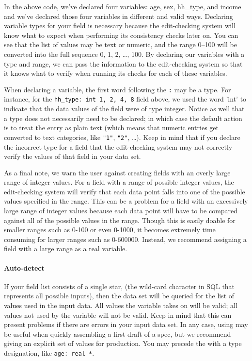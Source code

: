 \documentclass{article}
\begin{document}
In the above code, we've declared four variables: age, sex, hh\_type, and income and we've 
declared those four variables in different and valid ways. Declaring variable types for your 
field is necessary because the edit-checking system will know what to expect when performing 
its consistency checks later on. You can see that the list of values may be text 
or numeric, and the range 0--100 will be converted into the full sequence 0, 1, 2, \dots, 100. 
By declaring our variables with a type and range, we can pass the information to the edit-checking system 
so that it knows what to verify when running its checks for each of these variables. 

When declaring a variable, the first word following the {\tt :} may be a type. For instance, 
for the {\tt hh\_type: int 1, 2, 4, 8} field above, we used the word 'int' to indicate that 
the data values of the field were of type integer. Notice as well that a type does not necessarily 
need to be declared; in which case the default action is to treat the entry as plain text (which means
that numeric entries get converted to text categories, like {\tt "1"}, {\tt "2"}, \dots). Keep in mind 
that if you declare the incorrect type for a field that the edit-checking system may not correctly 
verify the values of that field in your data set.

As a final note, we warn the user against creating fields with an overly large range of integer 
values. For a field with a range of possible integer values, the edit-checking system will verify 
that each data point falls into one of the possible values specified in the range. This can be a 
problem for a field with an excessively large range of integer values because each data point will 
have to be compared against all of the possible values in the range. Though this is easily doable for 
smaller ranges such as 0-100 or even 0-1000, it becomes extremely time consuming for larger ranges such 
as 0-600000. Instead, we recommend assigning a field with a large range as a real variable.

\paragraph{Auto-detect} If your field list consists of a single star, {\tt *} (the wild-card character 
in SQL that represents all possible inputs), then the data set will be queried for the list of values 
used in the input data. All values the variable takes on will be valid; all values not used 
by the variable will not be valid. Keep in mind that this can present problems if there are errors 
in your input data set.
In any case, using {\tt *} may be useful when quickly assembling a first draft of a spec, but we recommend
giving an explicit set of values for production. You may precede the {\tt *}
with a type designation, like {\tt age: real *}.\\
\end{document}
